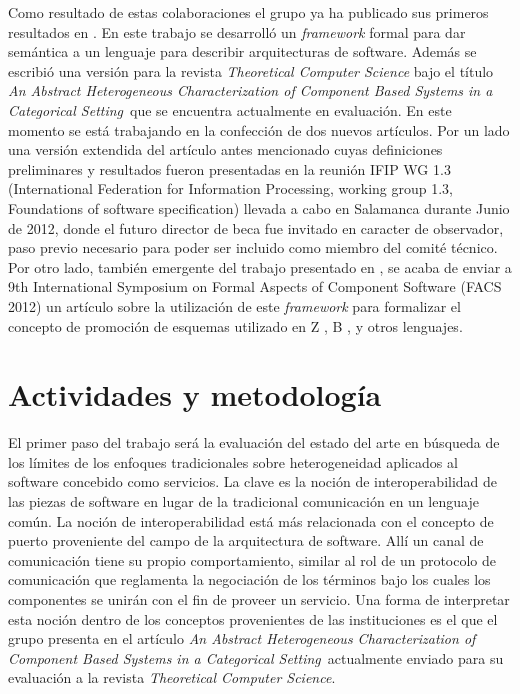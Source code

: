 \documentclass[a4paper, 11pt]{article}
\newcommand{\paperola}{\emph{An Abstract Heterogeneous Characterization of Component Based Systems in a Categorical Setting}}
\begin{document}
Como resultado de estas colaboraciones el grupo ya ha publicado sus primeros resultados en \cite{castro:ictac10}. En este trabajo se desarrolló un \emph{framework} formal para dar semántica a un lenguaje para describir arquitecturas de software. Además se escribió una versión para la revista \emph{Theoretical Computer Science} bajo el título \paperola\ que se encuentra actualmente en evaluación. En este momento se está trabajando en la confección de dos nuevos artículos. Por un lado una versión extendida del artículo antes mencionado cuyas definiciones preliminares y resultados fueron presentadas en la reunión IFIP WG 1.3 (International Federation for Information Processing, working group 1.3, Foundations of software specification) llevada a cabo en Salamanca durante Junio de 2012, donde el futuro director de beca fue invitado en caracter de observador, paso previo necesario para poder ser incluido como miembro del comité técnico. Por otro lado, también emergente del trabajo presentado en \cite{castro:ictac10}, se acaba de enviar a 9th International Symposium on Formal Aspects of Component Software (FACS 2012) un artículo sobre la utilización de este \emph{framework} para formalizar el concepto de promoción de esquemas utilizado en Z \cite{spivey88}, B \cite{abrial96}, y otros lenguajes.

\section{Actividades y metodología}
El primer paso del trabajo será la evaluación del estado del arte en búsqueda de los límites de los enfoques tradicionales sobre heterogeneidad aplicados al software concebido como servicios. La clave es la noción de interoperabilidad de las piezas de software en lugar de la tradicional comunicación en un lenguaje común. La noción de interoperabilidad está más relacionada con el concepto de puerto proveniente del campo de la arquitectura de software. Allí un canal de comunicación tiene su propio comportamiento, similar al rol de un protocolo de comunicación que reglamenta la negociación de los términos bajo los cuales los componentes se unirán con el fin de proveer un servicio. Una forma de interpretar esta noción dentro de los conceptos provenientes de las instituciones es el que el grupo presenta en el artículo \paperola\ actualmente enviado para su evaluación a la revista \emph{Theoretical Computer Science}.
\end{document}
